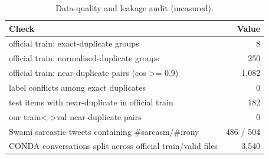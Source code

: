\begin{table}[t]
\centering
\small
\caption{Data-quality and leakage audit (measured).}
\label{tab:tab03_data_quality}
\begin{tabular}{lr}
\toprule
Check & Value \\
\midrule
official train: exact-duplicate groups & 8 \\
official train: normalised-duplicate groups & 250 \\
official train: near-duplicate pairs (cos >= 0.9) & 1,082 \\
label conflicts among exact duplicates & 0 \\
test items with near-duplicate in official train & 182 \\
our train<->val near-duplicate pairs & 0 \\
Swami sarcastic tweets containing \#sarcasm/\#irony & 486 / 504 \\
CONDA conversations split across official train/valid files & 3,540 \\
\bottomrule
\end{tabular}
\end{table}
